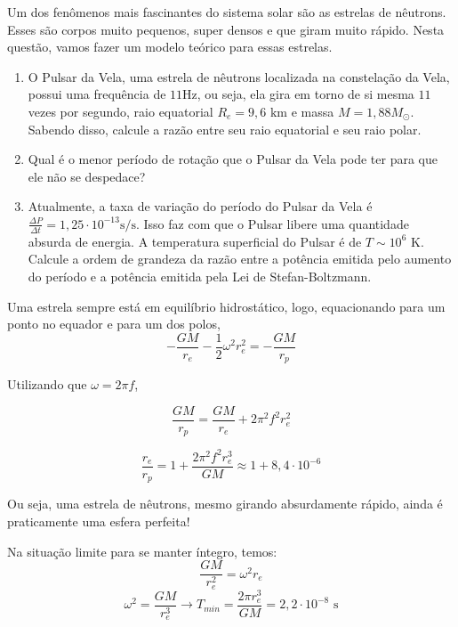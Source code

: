 \documentclass[11pt]{article}
\begin{document}
\begin{pproblem} Um dos fenômenos mais fascinantes do sistema solar são as estrelas de nêutrons. Esses são corpos muito pequenos, super densos e que giram muito rápido. Nesta questão, vamos fazer um modelo teórico para essas estrelas.
    \begin{enumerate}[label=\textbf{\alph*)}]
        \item O Pulsar da Vela, uma estrela de nêutrons localizada na constelação da Vela, possui uma frequência de \(11 \text{Hz}\), ou seja, ela gira em torno de si mesma \(11\) vezes por segundo, raio equatorial \(R_e = 9,6\text{ km}\) e massa \(M = 1,88M_\odot\). Sabendo disso, calcule a razão entre seu raio equatorial e seu raio polar.
        \item Qual é o menor período de rotação que o Pulsar da Vela pode ter para que ele não se despedace?
        \item Atualmente, a taxa de variação do período do Pulsar da Vela é \(\frac{\Delta P}{\Delta t} = 1,25 \cdot 10^{-13}\text{s/s}\). Isso faz com que o Pulsar libere uma quantidade absurda de energia. A temperatura superficial do Pulsar é de \(T \sim 10^6\text{ K}\). Calcule a ordem de grandeza da razão entre a potência emitida pelo aumento do período e a potência emitida pela Lei de Stefan-Boltzmann.
    \end{enumerate}
    \begin{pssolution*}{}{}
        \begin{alternativas}
            \item Uma estrela sempre está em equilíbrio hidrostático, logo, equacionando para um ponto no equador e para um dos polos,
            \[-\frac{GM}{r_e}-\frac{1}{2}\omega^2r_e^2 = -\frac{GM}{r_p}\]

            Utilizando que \(\omega = 2\pi f\),

            \[\frac{GM}{r_p} = \frac{GM}{r_e}+2\pi^2f^2r_e^2\]

            \[\boxed{\frac{r_e}{r_p} = 1+\frac{2\pi^2f^2r_e^3}{GM} \approx 1 + 8,4\cdot10^{-6}}\]

            Ou seja, uma estrela de nêutrons, mesmo girando absurdamente rápido, ainda é praticamente uma esfera perfeita!

            \item Na situação limite para se manter íntegro, temos:
            \[\frac{GM}{r_e^2} = \omega^2r_e\]
            \[\omega^2 = \frac{GM}{r_e^3} \rightarrow \boxed{T_{min} = \frac{2\pi r_e^3}{GM} = 2,2\cdot10^{-8}\text{ s}}\]


\end{alternativas}
\end{pssolution*}
\end{pproblem}
\end{document}
